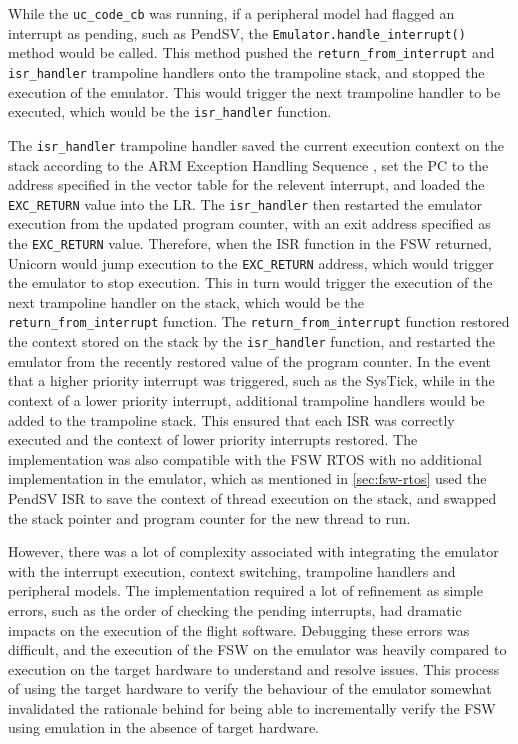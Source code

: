 \documentclass[../report.tex]{subfiles}
\begin{document}
While the \lstinline|uc_code_cb| was running, if a peripheral model had flagged an
interrupt as pending, such as PendSV, the
\lstinline|Emulator.handle_interrupt()| method would be called. This method
pushed the \lstinline|return_from_interrupt| and \lstinline|isr_handler| trampoline
handlers onto the trampoline stack, and stopped the execution of the emulator.
This would trigger the next trampoline handler to be executed, which would be
the \lstinline|isr_handler| function.

The \lstinline|isr_handler| trampoline handler saved the current execution
context on the stack according to the ARM Exception Handling Sequence
\citep{ARM_Exception}, set the PC to the address specified in the vector table
for the relevent interrupt, and loaded the \lstinline|EXC_RETURN| value into
the LR. The \lstinline|isr_handler| then restarted the emulator execution from
the updated program counter, with an exit address specified as the
\lstinline|EXC_RETURN| value. Therefore, when the ISR function in the FSW
returned, Unicorn would jump execution to the \lstinline|EXC_RETURN| address,
which would trigger the emulator to stop execution. This in turn would trigger
the execution of the next trampoline handler on the stack, which would be the
\lstinline|return_from_interrupt| function. The
\lstinline|return_from_interrupt| function restored the context stored on the
stack by the \lstinline|isr_handler| function, and restarted the emulator from
the recently restored value of the program counter. In the event that a higher
priority interrupt was triggered, such as the SysTick, while in the context of
a lower priority interrupt, additional trampoline handlers would be added to
the trampoline stack. This ensured that each ISR was correctly executed and the
context of lower priority interrupts restored. The implementation was also
compatible with the FSW RTOS with no additional implementation in the emulator,
which as mentioned in \autoref{sec:fsw-rtos} used the PendSV ISR to save the
context of thread execution on the stack, and swapped the stack pointer and
program counter for the new thread to run.

However, there was a lot of complexity associated with integrating the emulator
with the interrupt execution, context switching, trampoline handlers and
peripheral models. The implementation required a lot of refinement as simple
errors, such as the order of checking the pending interrupts, had dramatic
impacts on the execution of the flight software. Debugging these errors was
difficult, and the execution of the FSW on the emulator was heavily compared to
execution on the target hardware to understand and resolve issues. This process
of using the target hardware to verify the behaviour of the emulator somewhat
invalidated the rationale behind  for being able to incrementally
verify the FSW using emulation in the absence of target hardware.
\end{document}
